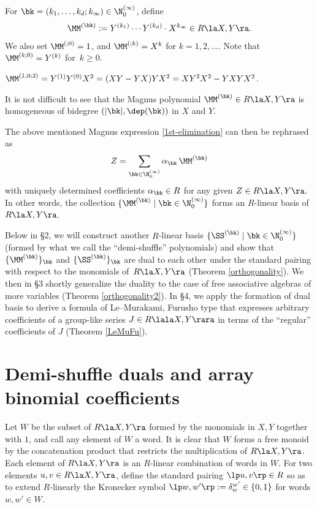 \begin{Definition}
\label{defMagnus}
For $\bk=(k_1,\dots,k_d; k_\infty)\in\N_0^{(\infty)}$, define
$$
\MM^{(\bk)}:=Y^{(k_1)}\cdots Y^{(k_d)} \cdot X^{k_\infty} \in R\la X,Y\ra.
$$
We also set $\MM^{(;0)}=1$, and $\MM^{(;k)}=X^k$ for $k=1,2,\dots$.
Note that $\MM^{(k;0)}=Y^{(k)}$ for~$k\ge 0$.
\end{Definition}

\begin{Example} 
$\MM^{(1,0;2)}=Y^{(1)}Y^{(0)}X^2=(XY-YX)YX^2=XY^2X^2-YXYX^2$.
\end{Example}

It is not difficult to see that the Magnus polynomial $\MM^{(\bk)}\in R\la X,Y\ra$ 
is homogeneous
of bidegree $(|\bk|,\dep(\bk))$ in $X$ and $Y$.

The above mentioned Magnus expression \eqref{1st-elimination}
can then be rephrased as
\begin{equation} \label{Magnus}
Z=\sum_{\bk\in \N_0^{(\infty)}}
\alpha_{\bk}\, \MM^{(\bk)}
\end{equation}
with uniquely determined coefficients $\alpha_{\bk}\in R$ for any given 
$Z\in R\la X,Y\ra$.
In other words, the collection $\{\MM^{(\bk)}\mid \bk\in  \N_0^{(\infty)}\}$ 
forms an $R$-linear basis of $R\la X,Y\ra$.

Below in \S 2, we will construct another $R$-linear basis 
$\{\SS^{(\bk)}\mid \bk\in  \N_0^{(\infty)}\}$
(formed by what we call the ``demi-shuffle'' polynomials)
and show that 
$\{\MM^{(\bk)}\}_\bk$
and $\{\SS^{(\bk)}\}_\bk$
are dual to each other under the standard pairing
with respect to the monomials of~$R\la X,Y\ra$
(Theorem \ref{orthogonality}).
We then in \S 3 shortly generalize the duality to the case of
free associative algebras of more variables (Theorem 
\ref{orthogonality2}). 
In \S 4, we apply the formation of dual basis 
to derive a formula of Le--Murakami, Furusho type 
that expresses arbitrary coefficients of a group-like series 
$J\in R\lala X,Y\rara$ in terms of 
the ``regular'' coefficients of $J$
(Theorem \ref{LeMuFu}).  

\section{Demi-shuffle duals and array binomial coefficients}

Let $W$ be the subset of $R\la X,Y\ra$ formed by the monomials in $X,Y$ 
together with $1$, and call any element of $W$ a word. 
It is clear that $W$ forms a free monoid by the concatenation product
that restricts the multiplication of $R\la X,Y\ra$.
Each element of $R\la X,Y\ra$ is an $R$-linear combination of words in $W$.
For two elements $u,v\in R\la X,Y\ra$, define the standard pairing $\lp u,v\rp\in R$
so as to extend $R$-linearly the Kronecker symbol $\lp w,w'\rp:=\delta_{w}^{w'}\in\{0,1\}$
for words $w,w'\in W$.

